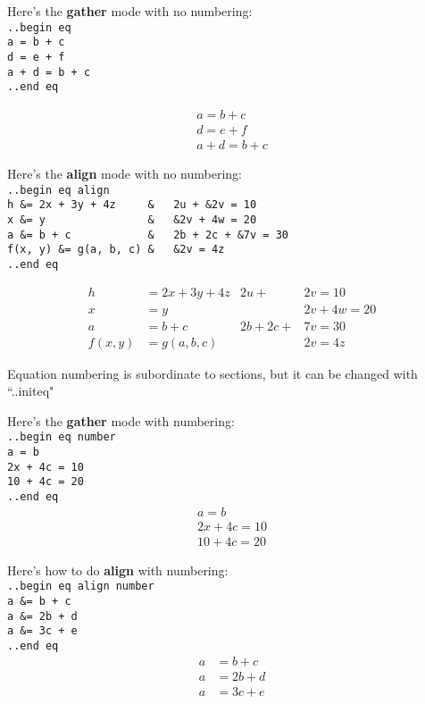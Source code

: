 \documentclass[12pt]{article}
\newcommand{\nl}{\\}
\renewcommand\bold{\textbf}
\numberwithin{equation}{section}
\begin{document}
\begin{flushleft}
Here's the \bold{gather} mode with no numbering: \nl
\verb|..begin eq|\nl
\verb|a = b + c|\nl
\verb|d = e + f|\nl
\verb|a + d = b + c|\nl
\verb|..end eq|

\begin{gather*}
a = b + c \\
d = e + f \\
a + d = b + c 
\end{gather*}

\medskip

Here's the \bold{align} mode with no numbering: \nl
\verb|..begin eq align|\nl
\verb|h &= 2x + 3y + 4z     &   2u + &2v = 10|\nl
\verb|x &= y                &   &2v + 4w = 20|\nl
\verb|a &= b + c            &   2b + 2c + &7v = 30|\nl
\verb|f(x, y) &= g(a, b, c) &   &2v = 4z|\nl
\verb|..end eq|

\begin{align*}
h &= 2x + 3y + 4z           &   2u + &2v = 10 \\
x &= y                      &   &2v + 4w = 20 \\
a &= b + c                  &   2b + 2c + &7v = 30 \\
f(x, y) &= g(a, b, c)       &   &2v = 4z 
\end{align*}

\medskip

Equation numbering is subordinate to sections, but it can be changed with ``..initeq"

\medskip

Here's the \bold{gather} mode with numbering: \nl
\verb|..begin eq number|\nl
\verb|a = b|\nl
\verb|2x + 4c = 10|\nl
\verb|10 + 4c = 20|\nl
\verb|..end eq|
\begin{gather}
a = b \\
2x + 4c = 10 \\
10 + 4c = 20 
\end{gather}

\medskip

Here's how to do \bold{align} with numbering: \nl
\verb|..begin eq align number|\nl
\verb|a &= b + c|\nl
\verb|a &= 2b + d|\nl
\verb|a &= 3c + e|\nl
\verb|..end eq|
\begin{align}
a &= b + c \\
a &= 2b + d \\
a &= 3c + e 
\end{align}

\end{flushleft}
\end{document}
